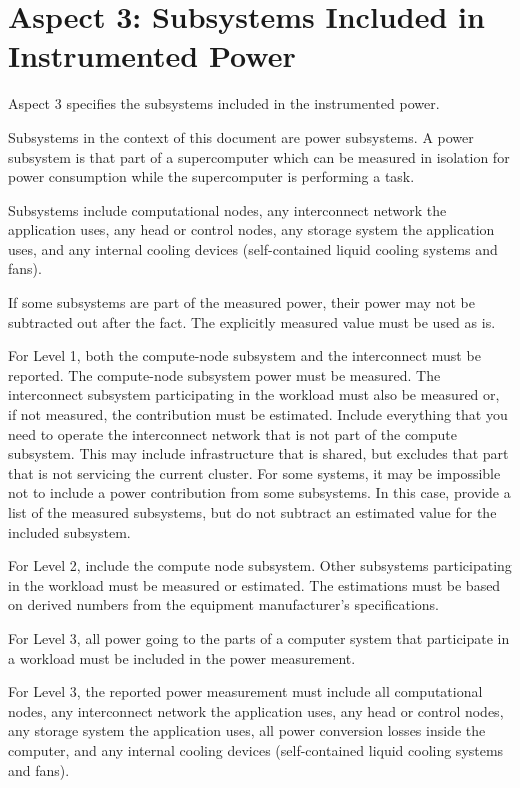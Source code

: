 \section{Aspect 3: Subsystems Included in Instrumented Power}
\label{sec:A3SIiIP}
\noindent
Aspect 3 specifies the subsystems included in the instrumented power. 
\wl

\noindent
Subsystems in the context of this document are power subsystems. A power subsystem is that part of a supercomputer which can be measured in isolation for power consumption while the supercomputer is performing a task. 
\wl

\noindent
Subsystems include computational nodes, any interconnect network the application uses, any head or control nodes, any storage system the application uses, and any internal cooling devices (self-contained liquid cooling systems and fans).
\wl

\noindent
If some subsystems are part of the measured power, their power may not be subtracted out after the fact.  The explicitly measured value must be used as is.
\wl


\noindent
For Level 1, both the compute-node subsystem and the interconnect must be reported.  
The compute-node subsystem power must be measured. 
The interconnect subsystem participating in the workload must also be measured or, if not measured, the contribution must be estimated.
Include everything that you need to operate the interconnect network that is not part of the compute subsystem. 
This may include infrastructure that is shared, but excludes that part that is not servicing the current cluster.
For some systems, it may be impossible not to include a power contribution from some subsystems. 
In this case, provide a list of the measured subsystems, but do not subtract an estimated value for the included subsystem. 
\wl

\noindent
For Level 2,  include the compute node subsystem. Other subsystems participating in the workload must be measured or estimated. The estimations must be based on derived numbers from the equipment manufacturer's specifications. 
\wl


\noindent
For Level 3, all power going to the parts of a computer system that participate in a workload must be included in the power measurement. 
\wl

\noindent
For Level 3, the reported power measurement must include all computational nodes, any interconnect network the application uses, any head or control nodes, any storage system the application uses, all power conversion losses inside the computer, and any internal cooling devices (self-contained liquid cooling systems and fans).  
\wl

